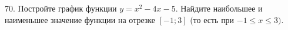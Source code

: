 70. Постройте график функции $y=x^2-4x-5.$ Найдите наибольшее и наименьшее значение функции на отрезке $[-1;3]$ (то есть при $-1\leqslant x \leqslant 3).$\\

